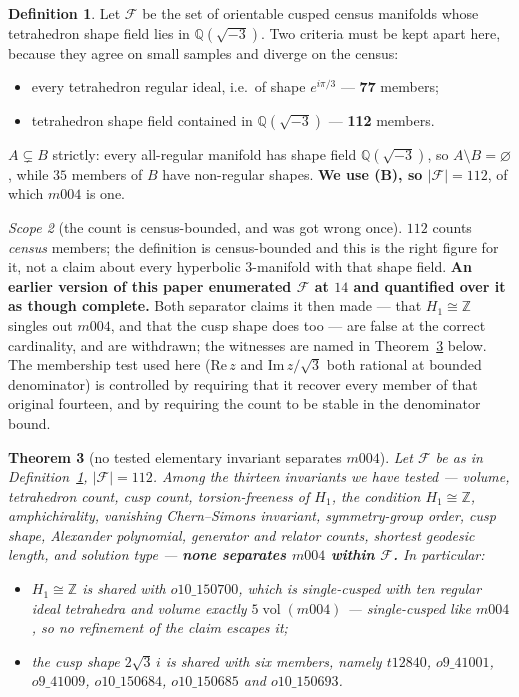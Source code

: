 \documentclass[11pt,a4paper]{article}
\newtheorem{theorem}{Theorem}[section]
\theoremstyle{definition}
\newtheorem{definition}[theorem]{Definition}
\theoremstyle{remark}
\newtheorem{scope}[theorem]{Scope}
\newcommand{\Z}{\mathbb{Z}}
\newcommand{\Q}{\mathbb{Q}}
\newcommand{\vol}{\operatorname{vol}}
\begin{document}
\begin{definition}\label{def:family}
Let $\mathcal{F}$ be the set of orientable cusped census manifolds whose tetrahedron shape field
lies in $\Q(\sqrt{-3})$. Two criteria must be kept apart here, because they agree on small samples
and diverge on the census:
\begin{itemize}[leftmargin=1.4em]
\item[\textbf{(A)}] every tetrahedron regular ideal, i.e.\ of shape $e^{i\pi/3}$ --- \textbf{77}
      members;
\item[\textbf{(B)}] tetrahedron shape field contained in $\Q(\sqrt{-3})$ --- \textbf{112} members.
\end{itemize}
$A\subsetneq B$ strictly: every all-regular manifold has shape field $\Q(\sqrt{-3})$, so
$A\setminus B=\varnothing$, while $35$ members of $B$ have non-regular shapes. \textbf{We use
{\normalfont(B)}, so $|\mathcal{F}|=112$}, of which $m004$ is one.
\end{definition}

\begin{scope}[the count is census-bounded, and was got wrong once]\label{sc:census}
$112$ counts \emph{census} members; the definition is census-bounded and this is the right figure
for it, not a claim about every hyperbolic $3$-manifold with that shape field. \textbf{An earlier
version of this paper enumerated $\mathcal{F}$ at $14$ and quantified over it as though complete.}
Both separator claims it then made --- that $H_1\cong\Z$ singles out $m004$, and that the cusp
shape does too --- are false at the correct cardinality, and are withdrawn; the witnesses are named
in Theorem~\ref{thm:family} below. The membership test used here ($\mathrm{Re}\,z$ and
$\mathrm{Im}\,z/\sqrt3$ both rational at bounded denominator) is controlled by requiring that it
recover every member of that original fourteen, and by requiring the count to be stable in the
denominator bound.
\end{scope}

\begin{theorem}[no tested elementary invariant separates $m004$]\label{thm:family}
Let $\mathcal{F}$ be as in Definition~\ref{def:family}, $|\mathcal{F}|=112$. Among the thirteen
invariants we have tested --- volume, tetrahedron count, cusp count, torsion-freeness of $H_1$, the
condition $H_1\cong\Z$, amphichirality, vanishing Chern--Simons invariant, symmetry-group order,
cusp shape, Alexander polynomial, generator and relator counts, shortest geodesic length, and
solution type --- \textbf{none separates $m004$ within $\mathcal{F}$.} In particular:
\begin{itemize}[leftmargin=1.4em]
\item $H_1\cong\Z$ is shared with $o10\_150700$, which is single-cusped with ten regular ideal
      tetrahedra and volume exactly $5\vol(m004)$ --- single-cusped like $m004$, so no refinement
      of the claim escapes it;
\item the cusp shape $2\sqrt3\,i$ is shared with six members, namely $t12840$, $o9\_41001$,
      $o9\_41009$, $o10\_150684$, $o10\_150685$ and $o10\_150693$.
\end{itemize}
\end{theorem}
\end{document}
